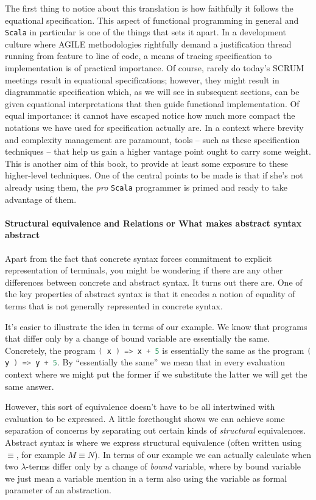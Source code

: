 The first thing to notice about this translation is how faithfully it
follows the equational specification. This aspect of functional
programming in general and \texttt{Scala} in particular is one of the
things that sets it apart. In a development culture where AGILE
methodologies rightfully demand a justification thread running from
feature to line of code, a means of tracing specification to
implementation is of practical importance. Of course, rarely do
today's SCRUM meetings result in equational specifications; however,
they might result in diagrammatic specification which, as we will see
in subsequent sections, can be given equational interpretations that
then guide functional implementation. Of equal importance: it cannot
have escaped notice how much more compact the notations we have used
for specification actually are. In a context where brevity and
complexity management are paramount, tools -- such as these
specification techniques -- that help us gain a higher vantage point
ought to carry some weight. This is another aim of this book, to
provide at least some exposure to these higher-level techniques. One
of the central points to be made is that if she's not already using
them, the \emph{pro} \texttt{Scala} programmer is primed and ready to
take advantage of them.

\paragraph{Structural equivalence and Relations or What makes abstract syntax abstract}

Apart from the fact that concrete syntax forces commitment to explicit
representation of terminals, you might be wondering if there are any
other differences between concrete and abstract syntax. It turns out
there are. One of the key properties of abstract syntax is that it
encodes a notion of equality of terms that is not generally
represented in concrete syntax.

It's easier to illustrate the idea in terms of our example. We know
that programs that differ only by a change of bound variable are
essentially the same. Concretely, the program
\lstinline[language=Scala]!( x ) => x + 5! is essentially the same as
the program \lstinline[language=Scala]!( y ) => y + 5!. By
``essentially the same'' we mean that in every evaluation context
where we might put the former if we substitute the latter we will get
the same answer. 

However, this sort of equivalence doesn't have to be all intertwined
with evaluation to be expressed. A little forethought shows we can
achieve some separation of concerns by separating out certain kinds of
\emph{structural} equivalences. Abstract syntax is where we express
structural equivalence (often written using $\equiv$, for example $M \equiv N$).
In terms of our example we can actually calculate when two
$\lambda$-terms differ only by a change of \emph{bound} variable,
where by bound variable we just mean a variable mention in a term also
using the variable as formal parameter of an abstraction.

